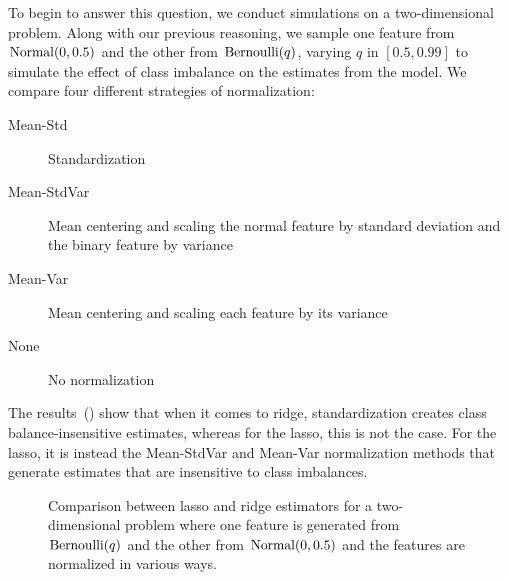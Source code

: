 To begin to answer this question, we conduct simulations on a two-dimensional problem. Along with our previous reasoning, we sample one feature from \(\operatorname{Normal}(0, 0.5)\) and the other from \(\operatorname{Bernoulli}(q)\), varying \(q\) in \([0.5, 0.99]\) to simulate the effect of class imbalance on the estimates from the model. We compare four different strategies of normalization:
\begin{description}
  \item[Mean-Std] Standardization
  \item[Mean-StdVar] Mean centering and scaling the normal feature by standard deviation and the binary feature by variance
  \item[Mean-Var] Mean centering and scaling each feature by its variance
  \item[None] No normalization
\end{description}

The results~() show that when it comes to ridge, standardization creates class balance-insensitive estimates, whereas for the lasso, this is not the case. For the lasso, it is instead the Mean-StdVar and Mean-Var normalization methods that generate estimates that are insensitive to class imbalances.

\begin{figure}[htpb]
  \centering
  \caption{%
    Comparison between lasso and ridge estimators for a two-dimensional problem where one feature is generated from \(\operatorname{Bernoulli}(q)\) and the other from \(\operatorname{Normal}(0, 0.5)\) and the features are normalized in various ways.}
  \label{fig:lasso-ridge-comparison}
\end{figure}

